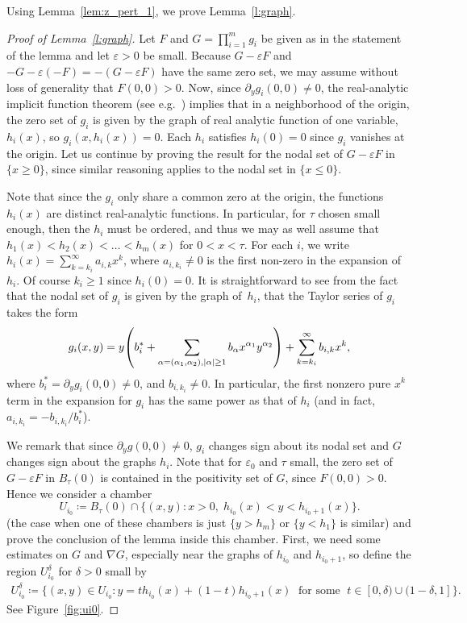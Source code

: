 \documentclass[10pt]{amsart}
\theoremstyle{definition}\newtheorem{defi}[theo]{Definition}\newtheorem{rema}[theo]{Remark}\newtheorem{exam}[theo]{Example}\newtheorem{exem}[theo]{Example}\newtheorem{nota}[theo]{Notation}
\newcommand{\abs}[1]{\left \lvert #1 \right \rvert}
\renewcommand{\epsilon}{\varepsilon}
\let\originalleft\left
\let\originalright\right
\renewcommand{\left}{\mathopen{}\mathclose\bgroup\originalleft}
\renewcommand{\right}{\aftergroup\egroup\originalright}
\begin{document}
Using Lemma~\ref{lem:z_pert_1}, we prove Lemma~\ref{l:graph}.

\begin{proof}[Proof of Lemma~\ref{l:graph}]
Let $F$ and $G=\prod_{i=1}^m g_i$ be given as in the statement of the lemma and let $\epsilon>0$ be small. Because $G-\epsilon F$ and $-G-\epsilon(-F)=-(G-\epsilon F)$ have the same zero set, we may assume without loss of generality that $F(0,0)>0$. Now, since $\partial_y g_i(0,0) \ne 0$, the real-analytic implicit function theorem (see e.g.~\cite[Theorem~2.3.5]{primer-real-analytic}) implies that in a neighborhood of the origin, the zero set of $g_i$ is given by the graph of real analytic function of one variable, $h_i(x)$, so $g_i(x, h_i(x)) = 0$. Each $h_i$ satisfies $h_i(0) =0$ since $g_i$ vanishes at the origin. Let us continue by proving the result for the nodal set of $G-\epsilon F$ in $\{x \ge 0\}$, since similar reasoning applies to the nodal set in $\{x \le 0\}$.

Note that since the $g_i$ only share a common zero at the origin, the functions $h_i(x)$ are distinct real-analytic functions. In particular, for $\tau$ chosen small enough, then the $h_i$ must be ordered, and thus we may as well assume that $h_1(x) < h_2(x) < \dots < h_m(x)$ for $ 0 < x < \tau$. For each $i$, we write $h_i(x) = \sum_{k = k_i}^\infty a_{i,k} x^k$, where $a_{i,k_i} \ne 0$ is the first non-zero in the expansion of $h_i$. Of course $k_i \ge 1$ since $h_i(0) = 0$. It is straightforward to see from the fact that the nodal set of $g_i$ is given by the graph of~$h_i$, that the Taylor series of $g_i$ takes the form
\begin{equation}\label{eqn:gi_ser}
g_i(x,y) = y \left(b_i^* + \sum_{\alpha = (\alpha_1, \alpha_2), \abs{\alpha} \ge 1} b_\alpha x^{\alpha_1} y^{\alpha_2} \right) + \sum_{k = k_i}^\infty b_{i, k} x^k,
\end{equation}
where $b_i^* = \partial_y g_i(0,0) \ne 0$, and $b_{i, k_i} \ne 0$. In particular, the first nonzero pure $x^k$ term in the expansion for $g_i$ has the same power as that of $h_i$ (and in fact, $a_{i,k_i} = -b_{i, k_i}/b_i^*$).

We remark that since $\partial_y g(0,0) \ne 0$, $g_i$ changes sign about its nodal set and $G$ changes sign about the graphs $h_i$. Note that for $\epsilon_0$ and $\tau$ small, the zero set of $G - \epsilon F$ in $B_\tau(0)$ is contained in the positivity set of $G$, since $F (0,0) > 0$. Hence we consider a chamber
\[
U_{i_0} \coloneqq B_\tau(0) \cap \bigl\{(x,y) : x > 0, \; h_{i_0}(x) < y < h_{i_0+1}(x)\bigr\}.
\]
(the case when one of these chambers is just $\{y > h_m\}$ or $\{ y < h_1\}$ is similar) and prove the conclusion of the lemma inside this chamber. First, we need some estimates on $G$ and $\nabla G$, especially near the graphs of $h_{i_0}$ and $h_{i_0+1}$, so define the region $U_{i_0}^\delta$ for $\delta >0$ small by
\begin{align*}
U_{i_0}^\delta \coloneqq \bigl \{(x,y) \in U_{i_0} : y = t h_{i_0}(x) + (1-t) h_{i_0+1}(x)\; \text{ for some }\; t \in [0, \delta) \cup (1-\delta, 1] \bigl \}.
\end{align*}
See Figure~\ref{fig:ui0}.


\end{proof}
\end{document}
